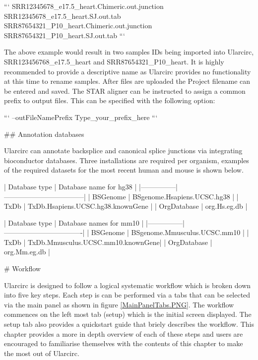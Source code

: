 ```
SRR12345678_e17.5_heart.Chimeric.out.junction 
SRR12345678_e17.5_heart.SJ.out.tab 
SRR87654321_P10_heart.Chimeric.out.junction 
SRR87654321_P10_heart.SJ.out.tab
```


The above example would result in two samples IDs being imported into Ularcirc, SRR123456768_e17.5_heart and SRR87654321_P10_heart. It is highly recommended to provide a descriptive name as Ularcirc provides no functionality at this time to rename samples. After files are uploaded the Project filename can be entered and saved. The STAR aligner can be instructed to assign a common prefix to output files. This can be specified with the following option:

```
--outFileNamePrefix Type_your_prefix_here 
```

## Annotation databases

Ularcirc can annotate backsplice and canonical splice junctions via integrating bioconductor databases. Three installations are required per organism, examples of the required datasets for the most recent human and mouse is shown below.



| Database type | Database name for hg38            |
|---------------|-----------------------------------|
| BSGenome      | BSgenome.Hsapiens.UCSC.hg38       |
| TxDb          | TxDb.Hsapiens.UCSC.hg38.knownGene |
| OrgDatabase   | org.Hs.eg.db                      |



| Database type | Database names for mm10           |
|---------------| ----------------------------------|
| BSGenome      | BSgenome.Mmusculus.UCSC.mm10      |
| TxDb          | TxDb.Mmusculus.UCSC.mm10.knownGene|
| OrgDatabase   | org.Mm.eg.db                      |


# Workflow

Ularcirc is designed to follow a logical systematic workflow which is broken down into five key steps. Each step is can be performed  via a tabs that can be selected via the main panel as shown in figure \ref{MainPanelTabs.PNG}. The workflow commences on the left most tab (setup) which is  the initial screen displayed. The setup tab also  provides a quickstart guide that briely describes the workflow. This chapter provides a more in depth overview of each of these steps and users are encouraged to familiarise themselves with the contents of this chapter to make the most out of Ularcirc.


